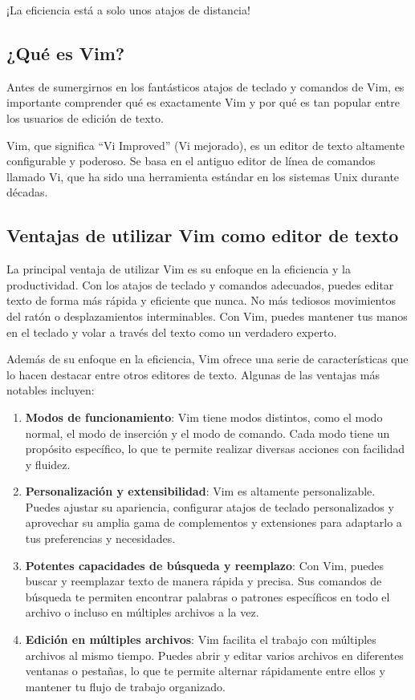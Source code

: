 \documentclass[
  a4paper,
]{article}
\begin{document}
¡La eficiencia está a solo unos atajos de distancia!

\hypertarget{quuxe9-es-vim}{%
\subsection{¿Qué es Vim?}\label{quuxe9-es-vim}}

Antes de sumergirnos en los fantásticos atajos de teclado y comandos de
Vim, es importante comprender qué es exactamente Vim y por qué es tan
popular entre los usuarios de edición de texto.

Vim, que significa ``Vi Improved'' (Vi mejorado), es un editor de texto
altamente configurable y poderoso. Se basa en el antiguo editor de línea
de comandos llamado Vi, que ha sido una herramienta estándar en los
sistemas Unix durante décadas.

\hypertarget{ventajas-de-utilizar-vim-como-editor-de-texto}{%
\subsection{Ventajas de utilizar Vim como editor de
texto}\label{ventajas-de-utilizar-vim-como-editor-de-texto}}

La principal ventaja de utilizar Vim es su enfoque en la eficiencia y la
productividad. Con los atajos de teclado y comandos adecuados, puedes
editar texto de forma más rápida y eficiente que nunca. No más tediosos
movimientos del ratón o desplazamientos interminables. Con Vim, puedes
mantener tus manos en el teclado y volar a través del texto como un
verdadero experto.

Además de su enfoque en la eficiencia, Vim ofrece una serie de
características que lo hacen destacar entre otros editores de texto.
Algunas de las ventajas más notables incluyen:

\begin{enumerate}
\def\labelenumi{\arabic{enumi}.}
\item
  \textbf{Modos de funcionamiento}: Vim tiene modos distintos, como el
  modo normal, el modo de inserción y el modo de comando. Cada modo
  tiene un propósito específico, lo que te permite realizar diversas
  acciones con facilidad y fluidez.
\item
  \textbf{Personalización y extensibilidad}: Vim es altamente
  personalizable. Puedes ajustar su apariencia, configurar atajos de
  teclado personalizados y aprovechar su amplia gama de complementos y
  extensiones para adaptarlo a tus preferencias y necesidades.
\item
  \textbf{Potentes capacidades de búsqueda y reemplazo}: Con Vim, puedes
  buscar y reemplazar texto de manera rápida y precisa. Sus comandos de
  búsqueda te permiten encontrar palabras o patrones específicos en todo
  el archivo o incluso en múltiples archivos a la vez.
\item
  \textbf{Edición en múltiples archivos}: Vim facilita el trabajo con
  múltiples archivos al mismo tiempo. Puedes abrir y editar varios
  archivos en diferentes ventanas o pestañas, lo que te permite alternar
  rápidamente entre ellos y mantener tu flujo de trabajo organizado.
\end{enumerate}
\end{document}
